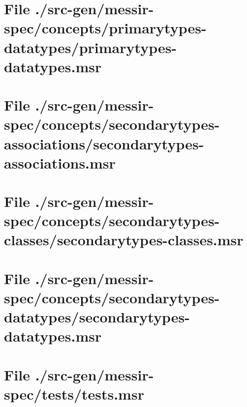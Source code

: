 \section[File /src-gen/messir-spec/concepts.../primarytypes-datatypes.msr]{File ./src-gen/messir-spec/concepts/primarytypes-datatypes/primarytypes-datatypes.msr}
\scriptsize

\normalsize
	
\section[File /src-gen/messir-spec/concepts.../secondarytypes-associations.msr]{File ./src-gen/messir-spec/concepts/secondarytypes-associations/secondarytypes-associations.msr}
\scriptsize

\normalsize
	
\section[File /src-gen/messir-spec/concepts.../secondarytypes-classes.msr]{File ./src-gen/messir-spec/concepts/secondarytypes-classes/secondarytypes-classes.msr}
\scriptsize

\normalsize
	
\section[File /src-gen/messir-spec/concepts.../secondarytypes-datatypes.msr]{File ./src-gen/messir-spec/concepts/secondarytypes-datatypes/secondarytypes-datatypes.msr}
\scriptsize

\normalsize
	
\section[File /src-gen/messir-spec/tests/tests.msr]{File ./src-gen/messir-spec/tests/tests.msr}
\scriptsize

\normalsize
	
